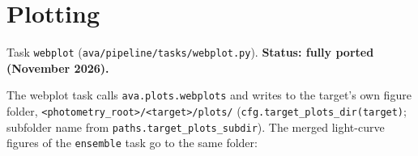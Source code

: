 \documentclass[12pt,a4paper]{article}
\begin{document}
\section{Plotting}
\label{sec:plotting}

Task \texttt{webplot} (\texttt{ava/\hspace{0pt}pipeline/\hspace{0pt}tasks/\hspace{0pt}webplot.py}).
\textbf{Status: fully ported (November 2026).}

The webplot task calls \texttt{ava.plots.webplots} and writes to the target's
own figure folder, \texttt{<photometry\_\hspace{0pt}root>/\hspace{0pt}<target>/\hspace{0pt}plots/\hspace{0pt}}
(\texttt{cfg.target\_\hspace{0pt}plots\_\hspace{0pt}dir(target)}; subfolder name from
\texttt{paths.target\_\hspace{0pt}plots\_\hspace{0pt}subdir}). The merged light-curve figures of the
\texttt{ensemble} task go to the same folder:
\end{document}
